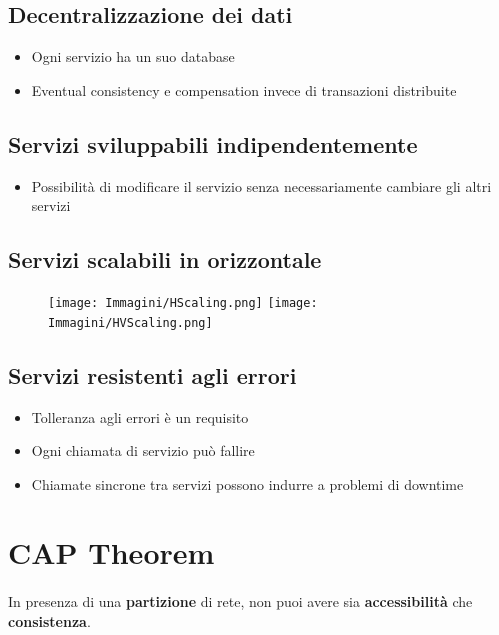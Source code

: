 \documentclass[a4paper, 12pt]{report}
\begin{document}
          \subsection{Decentralizzazione dei dati}
          \begin{itemize}
            \item Ogni servizio ha un suo database
            \item Eventual consistency e compensation invece di transazioni distribuite
          \end{itemize}
          \subsection{Servizi sviluppabili indipendentemente}
          \begin{itemize}
            \item Possibilità di modificare il servizio senza necessariamente cambiare gli altri servizi
          \end{itemize}
          \subsection{Servizi scalabili in orizzontale}
          \begin{figure}[htbp]
            \centering
            \texttt{[image: Immagini/HScaling.png]}
            \texttt{[image: Immagini/HVScaling.png]}
          \end{figure}
          \subsection{Servizi resistenti agli errori}
          \begin{itemize}
            \item Tolleranza agli errori è un requisito
            \item Ogni chiamata di servizio può fallire 
            \item Chiamate sincrone tra servizi possono indurre a problemi di downtime
          \end{itemize}
        \section{CAP Theorem}
        \paragraph{}In presenza di una \textbf{partizione} di rete, non puoi avere sia \textbf{accessibilità} che \textbf{consistenza}.
\end{document}
